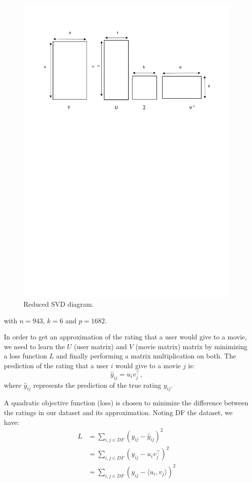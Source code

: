 \documentclass{article}
\begin{document}
\begin{figure}[H]
\centering
  \includegraphics[scale=0.5]{./images/svd.pdf}
  \caption{Reduced SVD diagram.}
  \label{fig:svd}
\end{figure}

with $n=943$, $k=6$ and $p=1682$.

In order to get an approximation of the rating that a user would give to a movie, we need to learn the $U$ (user matrix) and $V$ (movie matrix) matrix by minimizing a  loss function $L$ and finally performing a matrix multiplication on both.
The prediction of the rating that a user $i$ would give to a movie $j$
is:
\[ \hat{y}_{ij}=u_i v_j^{\top},\]
where $\hat{y}_{ij}$ represents the prediction of the true rating $y_{ij}$.

A quadratic objective function (loss) is chosen to minimize the difference between the ratings in our dataset and its approximation.
Noting DF the dataset, we have:
\begin{align*}
   L&=\sum_{i,j \in DF} (y_{ij} - \hat{y}_{ij})^2 \\
   &=\sum_{i,j \in DF} (y_{ij} - u_i v_j^{\top} )^2\\
   &=\sum_{i,j \in DF} (y_{ij} - \langle u_i,v_j\rangle  )^2
 \end{align*}
\end{document}
